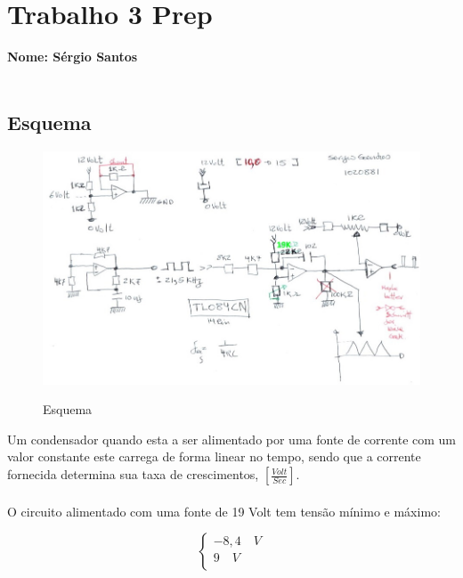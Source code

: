 \documentclass[titlepage, a4paper, 10pt, reqno, openany]{report}
\begin{document}
\renewcommand\thesection{\arabic{section}}
\renewcommand\thesubsection{\thesection.\arabic{subsection}}
\renewcommand\thesubsubsection{\thesection.\thesubsection.\arabic{subsubsection}}
\pagestyle{plain}%
\chapter*{Trabalho 3 Prep}
{\bf Nome: Sérgio Santos} \\
\hspace*{0.51cm}{\bf nº: 1020881}\\
\section{Esquema}
\begin{figure}[H]
	\centering
	\includegraphics[scale=0.6]{./image/esquema.jpg}\\
	\caption{Esquema}
\end{figure}
Um condensador quando esta a ser alimentado por uma fonte de corrente com um valor constante este carrega de forma linear no tempo, sendo que a corrente fornecida determina sua taxa de crescimentos, $\left[ \frac{Volt}{Sec} \right]$.\\ \\
O circuito alimentado com uma fonte de 19 Volt tem tensão mínimo e máximo: \\
\begin{minipage}[l]{0pt}
	$$\left\lbrace\begin{array}{c}
 	-8,4 \quad V \\
 	9 \quad V \\
 \end{array}\right.$$
\end{minipage}
\end{document}
